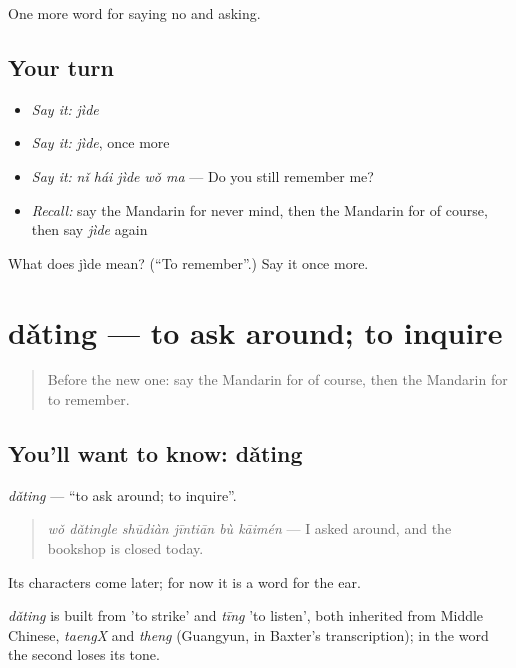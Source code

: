 \begin{grammarlens}[title={What you've built}]
One more word for saying no and asking.
\end{grammarlens}

\subsection*{Your turn}
\begin{itemize}
\raggedright
  \item \emph{Say it:} \emph{jìde}
  \item \emph{Say it:} \emph{jìde}, once more
  \item \emph{Say it:} \emph{nǐ hái jìde wǒ ma} — Do you still remember me?
  \item \emph{Recall:} say the Mandarin for never mind, then the Mandarin for of course, then say \emph{jìde} again
\end{itemize}

\begin{tcolorbox}[breakable,colback=teal!4,colframe=teal!35!black,title={Before you move on}]
What does jìde mean? (\textquotedblleft{}To remember\textquotedblright{}.) Say it once more.
\end{tcolorbox}
\section[dǎting]{dǎting — to ask around; to inquire}

\label{lesson:ZH-C217-dating}



\begin{quote}
Before the new one: say the Mandarin for of course, then the Mandarin for to remember.
\end{quote}

\subsection*{You'll want to know: dǎting}
\emph{dǎting} — \textquotedblleft{}to ask around; to inquire\textquotedblright{}.

\begin{quote}
\emph{wǒ dǎtingle shūdiàn jīntiān bù kāimén} — I asked around, and the bookshop is closed today.
\end{quote}

Its characters come later; for now it is a word for the ear.

\begin{cousinweb}
\emph{dǎting} is built from  'to strike' and \emph{tīng} 'to listen', both inherited from Middle Chinese, \emph{taengX} and \emph{theng} (Guangyun, in Baxter's transcription); in the word the second loses its tone.
\end{cousinweb}

